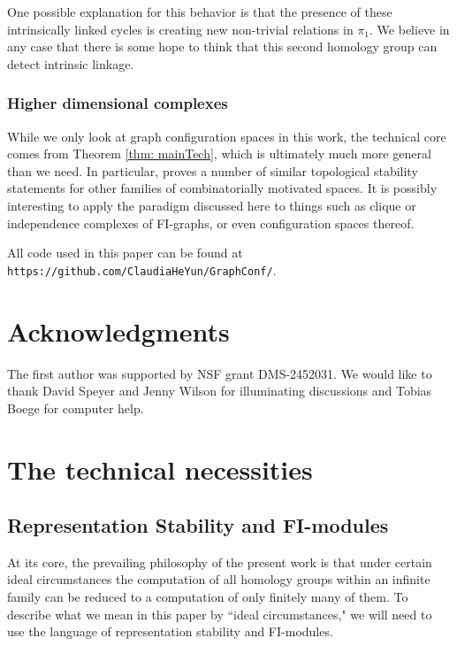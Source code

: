 \documentclass[12pt]{amsart}
\theoremstyle{definition}
\begin{document}
One possible explanation for this behavior is that the presence of these intrinsically linked cycles is creating new non-trivial relations in $\pi_1$. We believe in any case that there is some hope to think that this second homology group can detect intrinsic linkage.

\subsubsection{Higher dimensional complexes}

While we only look at graph configuration spaces in this work, the technical core comes from Theorem \ref{thm: mainTech}, which is ultimately much more general than we need. In particular, \cite{RW} proves a number of similar topological stability statements for other families of combinatorially motivated spaces. It is possibly interesting to apply the paradigm discussed here to things such as clique or independence complexes of FI-graphs, or even configuration spaces thereof.

All code used in this paper can be found at \texttt{https://github.com/ClaudiaHeYun/GraphConf/}.


\section*{Acknowledgments}
The first author was supported by NSF grant DMS-2452031. We would like to thank David Speyer and Jenny Wilson for illuminating discussions and Tobias Boege for computer help.

\section{The technical necessities}
\subsection{Representation Stability and FI-modules}\label{section:repstab}

At its core, the prevailing philosophy of the present work is that under certain ideal circumstances the computation of all homology groups within an infinite family can be reduced to a computation of only finitely many of them. To describe what we mean in this paper by ``ideal circumstances," we will need to use the language of representation stability and FI-modules.
\end{document}
